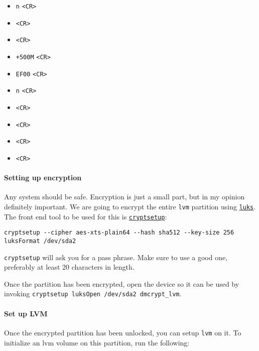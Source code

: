 \begin{itemize}
\item
  \texttt{n} \texttt{\textless{}CR\textgreater{}}
\item
  \texttt{\textless{}CR\textgreater{}}
\item
  \texttt{\textless{}CR\textgreater{}}
\item
  \texttt{+500M} \texttt{\textless{}CR\textgreater{}}
\item
  \texttt{EF00} \texttt{\textless{}CR\textgreater{}}
\item
  \texttt{n} \texttt{\textless{}CR\textgreater{}}
\item
  \texttt{\textless{}CR\textgreater{}}
\item
  \texttt{\textless{}CR\textgreater{}}
\item
  \texttt{\textless{}CR\textgreater{}}
\item
  \texttt{\textless{}CR\textgreater{}}
\end{itemize}

\paragraph{Setting up encryption}\label{setting-up-encryption}

Any system should be safe. Encryption is just a small part, but in my
opinion definitely important. We are going to encrypt the entire
\texttt{lvm} partition using
\href{https://en.wikipedia.org/wiki/Linux_Unified_Key_Setup}{\texttt{luks}}.
The front end tool to be used for this is
\href{https://en.wikipedia.org/wiki/Dm-crypt\#cryptsetup}{\texttt{cryptsetup}}:

\begin{verbatim}
cryptsetup --cipher aes-xts-plain64 --hash sha512 --key-size 256 luksFormat /dev/sda2
\end{verbatim}

\texttt{cryptsetup} will ask you for a pass phrase. Make sure to use a
good one, preferably at least 20 characters in length.

Once the partition has been encrypted, open the device so it can be used
by invoking \texttt{cryptsetup\ luksOpen\ /dev/sda2\ dmcrypt\_lvm}.

\paragraph{Set up LVM}\label{set-up-lvm}

Once the encrypted partition has been unlocked, you can setup
\texttt{lvm} on it. To initialize an lvm volume on this partition, run
the following:


